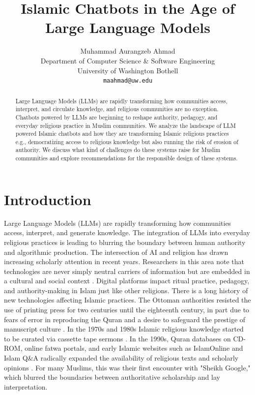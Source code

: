 \documentclass{article}
\title{Islamic Chatbots in the Age of Large Language Models}
\author{%
  Muhammad Aurangzeb Ahmad\\
  Department of Computer Science \& Software Engineering\\
  University of Washington Bothell\\
  \texttt{maahmad@uw.edu} \\
}
\begin{document}
\maketitle

\begin{abstract}
Large Language Models (LLMs) are rapidly transforming how communities access, interpret, and circulate knowledge, and religious communities are no exception. Chatbots powered by LLMs are beginning to reshape authority, pedagogy, and everyday religious practice in Muslim communities. We analyze the landscape of LLM powered Islamic chatbots and how they are transforming Islamic religious practices e.g., democratizing access to religious knowledge but also running the risk of erosion of authority. We discuss what kind of challenges do these systems raise for Muslim communities and explore recommendations for the responsible design of these systems.
\end{abstract}


\section{Introduction}
Large Language Models (LLMs) are rapidly transforming how communities access, interpret, and generate knowledge. The integration of LLMs into everyday religious practices is leading to blurring the boundary between human authority and algorithmic production. The intersection of AI and religion has drawn increasing scholarly attention in recent years. Researchers in this area note that technologies are never simply neutral carriers of information but are embedded in a cultural and social context \citep{campbell2021}. Digital platforms impact ritual practice, pedagogy, and authority-making in Islam just like other religions.  There is a long history of new technologies affecting Islamic practices. The Ottoman authorities resisted the use of printing press for two centuries until the eighteenth century, in part due to fears of error in reproducing the Quran and a desire to safeguard the prestige of manuscript culture \citep{messick1993}. In the 1970s and 1980s Islamic religious knowledge started to be curated via cassette tape sermons \citep{hirschkind2006}.  In the 1990s, Quran databases on CD-ROM, online fatwa portals, and early Islamic websites such as IslamOnline and Islam Q\&A radically expanded the availability of religious texts and scholarly opinions \citep{bunt2009}. For many Muslims, this was their first encounter with "Sheikh Google," which blurred the boundaries between authoritative scholarship and lay interpretation.
\end{document}
